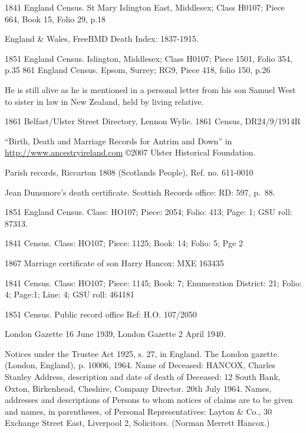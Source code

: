\begin{thebibliography}{99}
	1841 England Census.
	St Mary Islington East, Middlesex; Class H0107; Piece 664, Book 15, Folio 29, p.18
	
	England \& Wales, FreeBMD Death Index: 1837-1915.
	
	1851 England Census.
	Islington, Middlesex; Class H0107; Piece 1501, Folio 354, p.35
	861 England Census.
	Epsom, Surrey; RG9, Piece 418, folio 150, p.26
	
	He is still alive as he is mentioned in a personal letter from his son Samuel West to sister in law
	in New Zealand, held by living relative.
	
	1861 Belfast/Ulster Street Directory, Lennon Wylie.
	1861 Census, DR24/9/1914R 

	``Birth, Death and Marriage Records for Antrim and Down'' in
	\url{http://www.ancestryireland.com} \copyright 2007 Ulster Historical Foundation.

	Parish records, Riccarton 1808 (Scotlands People), Ref. no. 611-0010

	Jean Dunsmore's death certificate. Scottish Records office: RD: 597, p.~88.

	1851 England Census.
	Class: HO107; Piece: 2054; Folio: 413; Page: 1; GSU roll: 87313.
	
	1841 Census.
	Class: HO107; Piece: 1125; Book: 14; Folio: 5; Pge 2

	1867 Marriage certificate of son Harry Hancox: MXE 163435 

	1841 Census.
	Class: HO107; Piece: 1145; Book: 7; Enumeration District: 21; Folio: 4; Page:1; Line: 4; GSU roll: 464181
	
	1851 Census.
	Public record office Ref: H.O. 107/2050
	
	London Gazette 16 June 1939, London Gazette 2 April 1940.
	
	Notices under the Trustee Act 1925, s. 27, in England. The London gazette. (London, England), p. 10006, 1964.
	Name of Deceased: HANCOX, Charles Stanley
	Address, description and date of death of Deceased:
	12 South Bank, Oxton, Birkenhead, Cheshire, Company Director. 20th July 1964.
	Names, addresses and descriptions of Persons to whom notices of claims are to be given and names, in parentheses, of Personal Representatives:
	Layton \& Co., 30 Exchange Street East, Liverpool 2, Solicitors. (Norman Merrett Hancox.)


\end{thebibliography}
